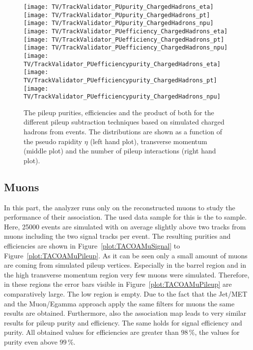 \begin{figure}[h!t]
  \centering
  \texttt{[image: TV/TrackValidator\_PUpurity\_ChargedHadrons\_eta]}
  \texttt{[image: TV/TrackValidator\_PUpurity\_ChargedHadrons\_pt]}
  \texttt{[image: TV/TrackValidator\_PUpurity\_ChargedHadrons\_npu]}
  \newline
  \texttt{[image: TV/TrackValidator\_PUefficiency\_ChargedHadrons\_eta]}
  \texttt{[image: TV/TrackValidator\_PUefficiency\_ChargedHadrons\_pt]}
  \texttt{[image: TV/TrackValidator\_PUefficiency\_ChargedHadrons\_npu]}
  \newline
  \texttt{[image: TV/TrackValidator\_PUefficiencypurity\_ChargedHadrons\_eta]}
  \texttt{[image: TV/TrackValidator\_PUefficiencypurity\_ChargedHadrons\_pt]}
  \texttt{[image: TV/TrackValidator\_PUefficiencypurity\_ChargedHadrons\_npu]}
  \caption[Pileup purity, efficiency and their product for the different pileup subtraction techniques based on simulated charged hadrons from \ttbar events]{The pileup purities, efficiencies and the product of both for the different pileup subtraction techniques based on simulated charged hadrons from \ttbar events. The distributions are shown as a function of the pseudo rapidity $\eta$ (left hand plot), transverse momentum (middle plot) and the number of pileup interactions (right hand plot). \label{plot:TACOACHPileup}}
\end{figure}



\clearpage{}

\subsection{Muons \label{sec:TASEFRDAM}}

In this part, the analyzer runs only on the reconstructed muons to study the performance of their association. The used data sample for this is the \Zz to \MM sample. Here, 25000 events are simulated with on average slightly above two tracks from muons including the two signal tracks per event. The resulting purities and efficiencies are shown in Figure~\ref{plot:TACOAMuSignal} to Figure~\ref{plot:TACOAMuPileup}. As it can be seen only a small amount of muons are coming from simulated pileup vertices. Especially in the barrel region and in the high transverse momentum region very few muons were simulated. Therefore, in these regions the error bars visible in Figure~\ref{plot:TACOAMuPileup} are comparatively large. The low \pt region is empty. Due to the fact that the Jet/MET and the Muon/Egamma approach apply the same filters for muons the same results are obtained. Furthermore, also the association map leads to very similar results for pileup purity and efficiency. The same holds for signal efficiency and purity. All obtained values for efficiencies are greater than $98\,\%$, the values for purity even above $99\,\%$.

